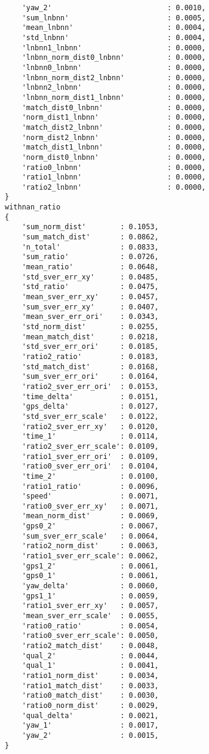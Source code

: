\begin{verbatim}
    'yaw_2'                           : 0.0010,
    'sum_lnbnn'                       : 0.0005,
    'mean_lnbnn'                      : 0.0004,
    'std_lnbnn'                       : 0.0004,
    'lnbnn1_lnbnn'                    : 0.0000,
    'lnbnn_norm_dist0_lnbnn'          : 0.0000,
    'lnbnn0_lnbnn'                    : 0.0000,
    'lnbnn_norm_dist2_lnbnn'          : 0.0000,
    'lnbnn2_lnbnn'                    : 0.0000,
    'lnbnn_norm_dist1_lnbnn'          : 0.0000,
    'match_dist0_lnbnn'               : 0.0000,
    'norm_dist1_lnbnn'                : 0.0000,
    'match_dist2_lnbnn'               : 0.0000,
    'norm_dist2_lnbnn'                : 0.0000,
    'match_dist1_lnbnn'               : 0.0000,
    'norm_dist0_lnbnn'                : 0.0000,
    'ratio0_lnbnn'                    : 0.0000,
    'ratio1_lnbnn'                    : 0.0000,
    'ratio2_lnbnn'                    : 0.0000,
}
withnan_ratio
{
    'sum_norm_dist'        : 0.1053,
    'sum_match_dist'       : 0.0862,
    'n_total'              : 0.0833,
    'sum_ratio'            : 0.0726,
    'mean_ratio'           : 0.0648,
    'std_sver_err_xy'      : 0.0485,
    'std_ratio'            : 0.0475,
    'mean_sver_err_xy'     : 0.0457,
    'sum_sver_err_xy'      : 0.0407,
    'mean_sver_err_ori'    : 0.0343,
    'std_norm_dist'        : 0.0255,
    'mean_match_dist'      : 0.0218,
    'std_sver_err_ori'     : 0.0185,
    'ratio2_ratio'         : 0.0183,
    'std_match_dist'       : 0.0168,
    'sum_sver_err_ori'     : 0.0164,
    'ratio2_sver_err_ori'  : 0.0153,
    'time_delta'           : 0.0151,
    'gps_delta'            : 0.0127,
    'std_sver_err_scale'   : 0.0122,
    'ratio2_sver_err_xy'   : 0.0120,
    'time_1'               : 0.0114,
    'ratio2_sver_err_scale': 0.0109,
    'ratio1_sver_err_ori'  : 0.0109,
    'ratio0_sver_err_ori'  : 0.0104,
    'time_2'               : 0.0100,
    'ratio1_ratio'         : 0.0096,
    'speed'                : 0.0071,
    'ratio0_sver_err_xy'   : 0.0071,
    'mean_norm_dist'       : 0.0069,
    'gps0_2'               : 0.0067,
    'sum_sver_err_scale'   : 0.0064,
    'ratio2_norm_dist'     : 0.0063,
    'ratio1_sver_err_scale': 0.0062,
    'gps1_2'               : 0.0061,
    'gps0_1'               : 0.0061,
    'yaw_delta'            : 0.0060,
    'gps1_1'               : 0.0059,
    'ratio1_sver_err_xy'   : 0.0057,
    'mean_sver_err_scale'  : 0.0055,
    'ratio0_ratio'         : 0.0054,
    'ratio0_sver_err_scale': 0.0050,
    'ratio2_match_dist'    : 0.0048,
    'qual_2'               : 0.0044,
    'qual_1'               : 0.0041,
    'ratio1_norm_dist'     : 0.0034,
    'ratio1_match_dist'    : 0.0033,
    'ratio0_match_dist'    : 0.0030,
    'ratio0_norm_dist'     : 0.0029,
    'qual_delta'           : 0.0021,
    'yaw_1'                : 0.0017,
    'yaw_2'                : 0.0015,
}





\end{verbatim}
